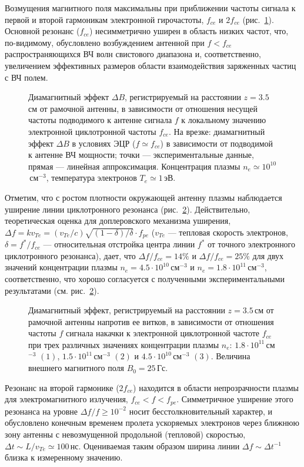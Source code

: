 \documentclass[autoref,10pt]{disser}
\begin{document}
Возмущения магнитного поля максимальны при приближении частоты сигнала к первой   и второй   гармоникам электронной гирочастоты, $f_{ce}$ и $2f_{ce}$ (\mbox{рис.~\ref{fig:cycl_line}}). Основной резонанс ($f_{ce}$) несимметрично уширен в область низких частот, что, по-видимому, обусловлено возбуждением антенной при $f<f_{ce}$ распространяющихся ВЧ волн свистового диапазона и, соответственно, увеличением эффективных размеров области взаимодействия заряженных частиц с ВЧ полем. 
\begin{figure}[H]
    \centering
    \def\svgwidth{0.6\columnwidth} %
    
    \caption{Диамагнитный эффект $\Delta{}B$, регистрируемый на расстоянии $z=3.5$\,см от рамочной антенны, в зависимости от отношения несущей частоты подводимого к антенне сигнала $f$ к локальному значению электронной циклотронной частоты $f_{ce}$. На врезке: диамагнитный эффект $\Delta{}B$ в условиях ЭЦР ($f\simeq f_{ce}$) в зависимости от подводимой к антенне ВЧ мощности; точки --- экспериментальные данные, прямая --- линейная аппроксимация. Концентрация плазмы $n_{e}\simeq 10^{10}$\,см$^{-3}$, температура электронов $T_e\simeq 1$\,эВ.}
    \label{fig:cycl_line}
\end{figure}
Отметим, что с ростом плотности окружающей антенну плазмы наблюдается уширение линии циклотронного резонанса (\mbox{рис.~\ref{fig:cyclotrone_lines}}). Действительно, теоретическая оценка для доплеровского механизма уширения, $\Delta{}f=kv_{Te}=(v_{Te}/c)\sqrt{(1-\delta{})/\delta{}}\cdot{}f_{pe}$ ($v_{Te}$ --- тепловая скорость электронов, $\delta{}=f^{*}/f_{ce}$ --- относительная отстройка центра линии $f^{*}$  от точного электронного циклотронного резонанса), дает, что $\Delta{}f/{}f_{ce} = 14\%$ и $\Delta{}f/f_{ce} = 25\%$ для двух значений концентрации плазмы $n_{e}=4.5\cdot{}10^{10}$\,см$^{-3}$ и $n_{e}=1.8\cdot{}10^{11}$\,см$^{-3}$, соответственно, что хорошо согласуется с полученными экспериментальными результатами  (см. \mbox{рис.~\ref{fig:cyclotrone_lines}}).
\begin{figure}[H]
    \centering
    \def\svgwidth{0.6\columnwidth} %
    
    \caption{Диамагнитный эффект, регистрируемый на расстоянии $z=3.5$\,см от рамочной антенны напротив ее витков, в зависимости от отношения частоты $f$ сигнала накачки к электронной циклотронной частоте $f_{ce}$ при трех различных значениях концентрации плазмы $n_{e}$: $1.8\cdot{}10^{11}$\,см$^{-3}$ $(1)$, $1.5\cdot{}10^{11}$\,см$^{-3}$ $(2)$ и $4.5\cdot{}10^{10}$\,см$^{-3}$ $(3)$. Величина внешнего магнитного поля $B_{0}=25$\,Гс.}
    \label{fig:cyclotrone_lines}
\end{figure}
Резонанс на второй гармонике ($2f_{ce}$) находится в области непрозрачности плазмы для электромагнитного излучения, $f_{ce}<f<f_{pe}$. Симметричное уширение этого резонанса на уровне $\Delta f/f\ge 10^{-2}$ носит бесстолкновительный характер, и обусловлено конечным временем пролета ускоряемых электронов через ближнюю зону антенны с невозмущенной продольной (тепловой) скоростью, $\Delta t\sim L/v_{Te}\simeq 100$\,нс. Оцениваемая таким образом ширина линии $\Delta f \sim \Delta t^{-1}$ близка к измеренному значению. 
\end{document}
